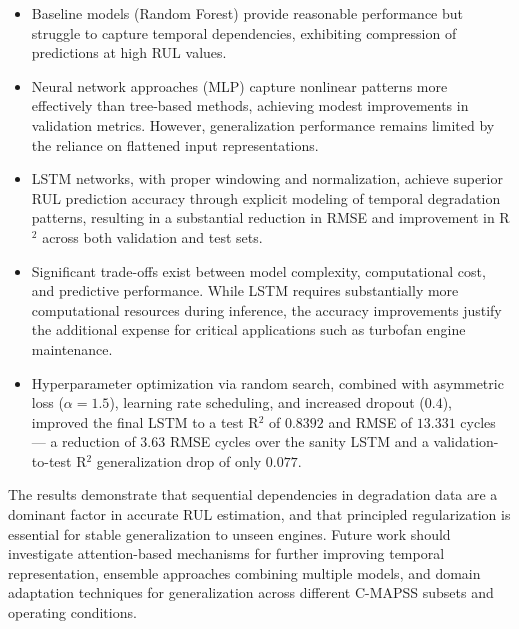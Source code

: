 \documentclass[conference]{IEEEtran}
\begin{document}
\begin{itemize}
    \item Baseline models (Random Forest) provide reasonable performance but struggle to capture temporal dependencies, exhibiting compression of predictions at high RUL values.
    \item Neural network approaches (MLP) capture nonlinear patterns more effectively than tree-based methods, achieving modest improvements in validation metrics. However, generalization performance remains limited by the reliance on flattened input representations.
    \item LSTM networks, with proper windowing and normalization, achieve superior RUL prediction accuracy through explicit modeling of temporal degradation patterns, resulting in a substantial reduction in RMSE and improvement in R$^2$ across both validation and test sets.
    \item Significant trade-offs exist between model complexity, computational cost, and predictive performance. While LSTM requires substantially more computational resources during inference, the accuracy improvements justify the additional expense for critical applications such as turbofan engine maintenance.
    \item Hyperparameter optimization via random search, combined with asymmetric loss ($\alpha = 1.5$), learning rate scheduling, and increased dropout ($0.4$), improved the final LSTM to a test R$^2$ of $0.8392$ and RMSE of $13.331$ cycles — a reduction of $3.63$ RMSE cycles over the sanity LSTM and a validation-to-test R$^2$ generalization drop of only $0.077$.
\end{itemize}

The results demonstrate that sequential dependencies in degradation data are a dominant factor in accurate RUL estimation, and that principled regularization is essential for stable generalization to unseen engines. Future work should investigate attention-based mechanisms for further improving temporal representation, ensemble approaches combining multiple models, and domain adaptation techniques for generalization across different C-MAPSS subsets and operating conditions.
\end{document}
